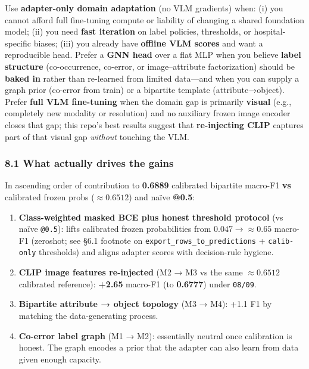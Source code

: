 \documentclass[
  11pt,
]{article}
\providecommand{\tightlist}{%
  \setlength{\itemsep}{0pt}\setlength{\parskip}{0pt}}
\begin{document}
Use \textbf{adapter-only domain adaptation} (no VLM gradients) when: (i)
you cannot afford full fine-tuning compute or liability of changing a
shared foundation model; (ii) you need \textbf{fast iteration} on label
policies, thresholds, or hospital-specific biases; (iii) you already
have \textbf{offline VLM scores} and want a reproducible head. Prefer a
\textbf{GNN head} over a flat MLP when you believe \textbf{label
structure} (co-occurrence, co-error, or image--attribute factorization)
should be \textbf{baked in} rather than re-learned from limited
data---and when you can supply a graph prior (co-error from train) or a
bipartite template (attribute→object). Prefer \textbf{full VLM
fine-tuning} when the domain gap is primarily \textbf{visual} (e.g.,
completely new modality or resolution) and no auxiliary frozen image
encoder closes that gap; this repo's best results suggest that
\textbf{re-injecting CLIP} captures part of that visual gap
\emph{without} touching the VLM.

\subsubsection{8.1 What actually drives the
gains}\label{what-actually-drives-the-gains}

In ascending order of contribution to \textbf{0.6889} calibrated
bipartite macro-F1 \textbf{vs} calibrated frozen probs
(\(\approx 0.6512\)) and naïve \textbf{@0.5}:

\begin{enumerate}
\def\labelenumi{\arabic{enumi}.}
\tightlist
\item
  \textbf{Class-weighted masked BCE plus honest threshold protocol} (vs
  naïve \texttt{@0.5}): lifts calibrated frozen probabilities from
  \(0.047 \rightarrow \approx 0.65\) macro-F1 (zeroshot; see §6.1
  footnote on \texttt{export\_rows\_to\_predictions} +
  \texttt{calib-only} thresholds) and aligns adapter scores with
  decision-rule hygiene.
\item
  \textbf{CLIP image features re-injected} (M2 → M3 vs the same
  \(\approx 0.6512\) calibrated reference): \textbf{+2.65} macro-F1 (to
  \textbf{0.6777}) under \texttt{08/09}.
\item
  \textbf{Bipartite attribute → object topology} (M3 → M4): +1.1 F1 by
  matching the data-generating process.
\item
  \textbf{Co-error label graph} (M1 → M2): essentially neutral once
  calibration is honest. The graph encodes a prior that the adapter can
  also learn from data given enough capacity.
\end{enumerate}
\end{document}
